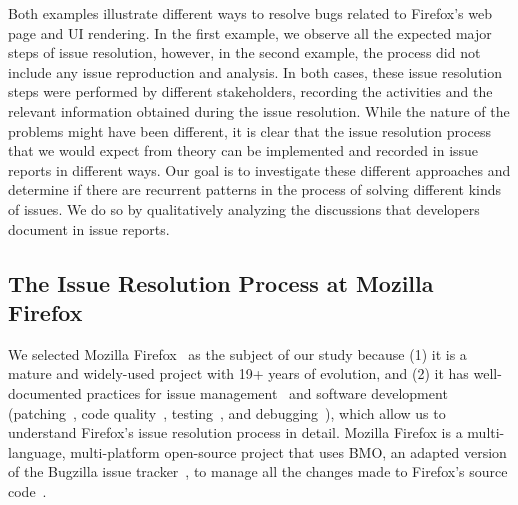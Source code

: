 Both examples illustrate different ways to resolve bugs related to Firefox's web page and UI rendering. 
In the first example, we observe all the expected major steps of issue resolution, however, in the second example, the process did not include any issue reproduction and analysis.
In both cases, these issue resolution steps were performed by different stakeholders, 
recording the activities and the relevant information obtained during the issue resolution. While the nature of the problems might have been different, it is clear that the issue resolution process that we would expect from theory can be implemented and recorded in issue reports in different ways. 
Our goal is to investigate these different approaches and determine if there are recurrent patterns in the process of solving different kinds of issues. We do so by qualitatively analyzing the discussions that developers document in issue reports.  
















\subsection{The Issue Resolution Process at Mozilla Firefox}
\label{sub:firefox_process}



We selected Mozilla Firefox~\cite{mozilla-firefox} as the subject of our study because (1) it is a mature and widely-used project with 19+ years of evolution, and (2) it has well-documented 
practices for issue management~\cite{firefox-bug-handling} and software development (\eg patching~\cite{firefox-patching}, code quality~\cite{firefox-code-quality,firefox-reviewer-checklist}, testing~\cite{firefox-security-bugs}, and  debugging~\cite{Working-Firefox}), which allow us to understand Firefox's issue resolution process in detail.  Mozilla Firefox is a multi-language, multi-platform open-source project that uses BMO, an adapted version of the Bugzilla issue tracker~\cite{bugzillaBugzilla}, to manage all the changes made to Firefox's source code~\cite{firefox-patching}.

